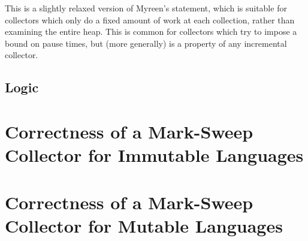 This is a slightly relaxed version of Myreen's statement, which is
suitable for collectors which only do a fixed amount of work at each
collection, rather than examining the entire heap. This is common for
collectors which try to impose a bound on pause times, but (more
generally) is a property of any incremental collector.

\subsection{Logic}


\section{Correctness of a Mark-Sweep Collector for Immutable
  Languages}


\section{Correctness of a Mark-Sweep Collector for Mutable Languages}

